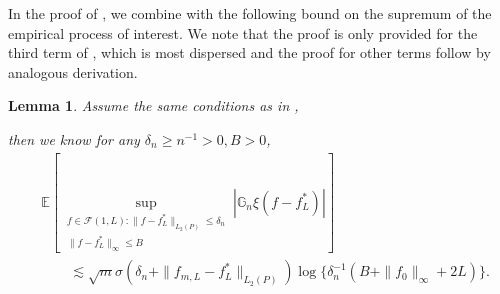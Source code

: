 \documentclass[12pt]{article}
\newtheorem{lemma}[theorem]{Lemma}
\begin{document}
\begin{appendices}
In the proof of , we combine  with the following bound on the supremum of the empirical process of interest. We note that the proof is only provided for the third term of , which is most dispersed and the proof for other terms follow by analogous derivation. 
\begin{lemma}
\label{multiplier process lemma}
Assume the same conditions as in , 

then we know for any $\delta_n \geq n^{-1} > 0, B > 0$,
\begin{equation}
\begin{aligned}
    &\mathbb{E}\left[ \sup _{\substack{f \in \mathcal{F}(1, L):\|f-f^*_{L}\|_{L_2(P)} \leq \delta_n \\\|f-f^*_{L}\|_{\infty} \leq B}}\left|\mathbb{G}_n \xi\left(f-f^*_{L}\right)\right|\right]\nonumber\\
    &\qquad \lesssim \sqrt{m}\sigma (\delta_n + \|f_{m,L} - f^*_{L}\|_{L_2(P)}) \log\{\delta_n^{-1}(B+\|f_{0}\|_\infty + 2L)\}.
\end{aligned}
\end{equation}
\end{lemma}


\end{appendices}
\end{document}
